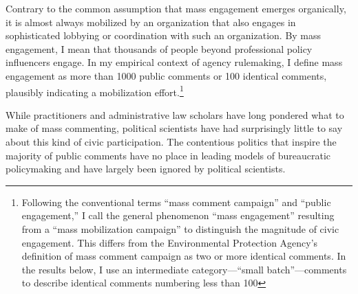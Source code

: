 
Contrary to the common assumption that mass engagement emerges organically, it is almost always mobilized by an organization that also engages in sophisticated lobbying or coordination with such an organization. By mass engagement, I mean that thousands of people beyond professional policy influencers engage. In my empirical context of agency rulemaking, I define mass engagement as more than 1000 public comments or 100 identical comments, plausibly indicating a mobilization effort.\footnote{Following the conventional terms ``mass comment campaign'' and ``public engagement,'' I call the general phenomenon ``mass engagement'' resulting from a ``mass mobilization campaign'' to distinguish the magnitude of civic engagement. This differs from the Environmental Protection Agency's definition of mass comment campaign as two or more identical comments. In the results below, I use an intermediate category---``small batch''---comments to describe identical comments numbering less than 100}  %

While practitioners and administrative law scholars have long pondered what to make of mass commenting, political scientists have had surprisingly little to say about this kind of civic participation. 
The contentious politics that inspire the majority of public comments have no place in leading models of bureaucratic policymaking and have largely been ignored by political scientists.

